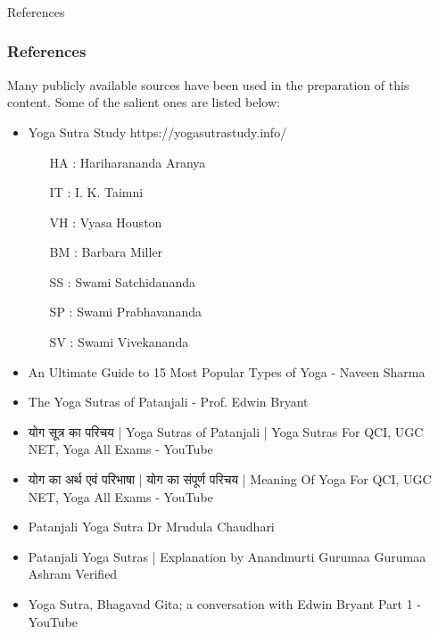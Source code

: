 \begin{frame}[fragile]\frametitle{}
\begin{center}
{\Large References}
\end{center}
\end{frame}


\begin{frame}[fragile]\frametitle{References}

Many publicly available sources have been used in the preparation of this content. Some of the salient ones are listed below:

	\begin{itemize}
	\item Yoga Sutra Study https://yogasutrastudy.info/
		\begin{itemize}
		\item [HA]: Hariharananda Aranya
		\item [IT]: I. K. Taimni
		\item [VH]: Vyasa Houston
		\item [BM]: Barbara Miller
		\item [SS]: Swami Satchidananda
		\item [SP]: Swami Prabhavananda
		\item [SV]: Swami Vivekananda
		\end{itemize}	
	\item An Ultimate Guide to 15 Most Popular Types of Yoga - Naveen Sharma
	\item The Yoga Sutras of Patanjali - Prof. Edwin Bryant
	\item योग सूत्र का परिचय | Yoga Sutras of Patanjali | Yoga Sutras For QCI, UGC NET, Yoga All Exams - YouTube
	\item योग का अर्थ एवं परिभाषा | योग का संपूर्ण परिचय | Meaning Of Yoga For QCI, UGC NET, Yoga All Exams - YouTube
	\item Patanjali Yoga Sutra Dr Mrudula Chaudhari
	\item Patanjali Yoga Sutras | Explanation by Anandmurti Gurumaa Gurumaa Ashram Verified
	\item Yoga Sutra, Bhagavad Gita; a conversation with Edwin Bryant Part 1 - YouTube
	\end{itemize}

\end{frame}

